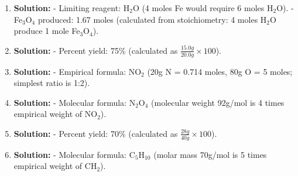\documentclass{article}
\begin{document}
\begin{enumerate}[label=\Alph*.]
    \item \textbf{Solution:} 
    - Limiting reagent: H\(_2\)O (4 moles Fe would require 6 moles H\(_2\)O).
    - Fe\(_3\)O\(_4\) produced: 1.67 moles (calculated from stoichiometry: 4 moles H\(_2\)O produce 1 mole Fe\(_3\)O\(_4\)).
    
    \item \textbf{Solution:} 
    - Percent yield: 75\% (calculated as \( \frac{15.0g}{20.0g} \times 100 \)).
    
    \item \textbf{Solution:} 
    - Empirical formula: NO\(_2\) (20g N = 0.714 moles, 80g O = 5 moles; simplest ratio is 1:2).
    
    \item \textbf{Solution:} 
    - Molecular formula: N\(_2\)O\(_4\) (molecular weight 92g/mol is 4 times empirical weight of NO\(_2\)).
    
    \item \textbf{Solution:} 
    - Percent yield: 70\% (calculated as \( \frac{28g}{40g} \times 100 \)).
    
    \item \textbf{Solution:} 
    - Molecular formula: C\(_5\)H\(_{10}\) (molar mass 70g/mol is 5 times empirical weight of CH\(_2\)).
\end{enumerate}
\end{document}
